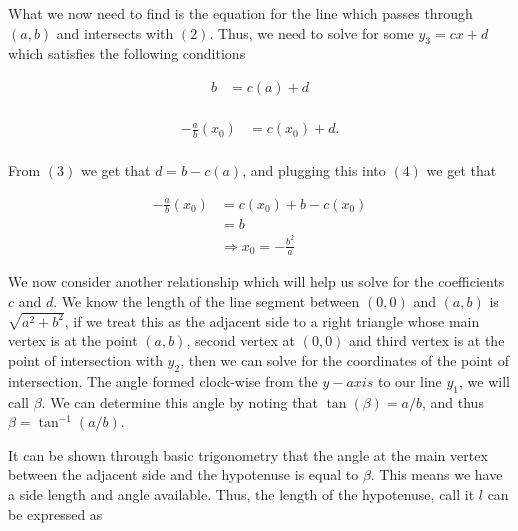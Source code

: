 \documentclass[12pt, a4paper]{article}
\begin{document}
\noindent What we now need to find is the equation for the line which passes through $(a,b)$ and intersects with $(2)$. Thus, we need to solve for some $y_3=cx+d$ which satisfies the following conditions

    \begin{equation}
        \begin{split}
            b &= c(a)+d \\ 
        \end{split}
    \end{equation}
    
    \begin{equation}
        \begin{split}
            -\frac{a}{b}(x_0) &= c(x_0)+d. \\ 
        \end{split}
    \end{equation}
    
\vspace{4mm}

\noindent From $(3)$ we get that $d=b-c(a)$, and plugging this into $(4)$ we get that

\begin{equation}
        \begin{split}
            -\frac{a}{b}(x_0) &= c(x_0)+b-c(x_0) \\
            &= b \\
            &\Rightarrow x_0 = -\frac{b^2}{a}
        \end{split}
    \end{equation}
    
\newpage

We now consider another relationship which will help us solve for the coefficients $c$ and $d$. We know the length of the line segment between $(0,0)$ and $(a,b)$ is $\sqrt{a^2+b^2}$, if we treat this as the adjacent side to a right triangle whose main vertex is at the point $(a,b)$, second vertex at $(0,0)$ and third vertex is at the point of intersection with $y_2$, then we can solve for the coordinates of the point of intersection. The angle formed clock-wise from the $y-axis$ to our line $y_1$, we will call $\beta$. We can determine this angle by noting that $\tan(\beta)=a/b$, and thus $\beta=\tan^{-1}(a/b)$.\par
It can be shown through basic trigonometry that the angle at the main vertex between the adjacent side and the hypotenuse is equal to $\beta$. This means we have a side length and angle available. Thus, the length of the hypotenuse, call it $l$ can be expressed as
\end{document}
